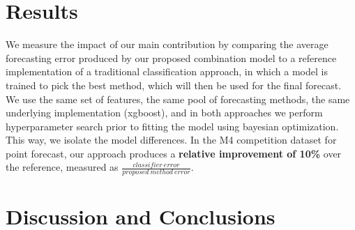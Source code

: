 \documentclass[11pt,a4paper,]{article}
\theoremstyle{definition}
\theoremstyle{definition}
\theoremstyle{definition}
\theoremstyle{remark}
\begin{document}
\section{Results}\label{results}

We measure the impact of our main contribution by comparing the average
forecasting error produced by our proposed combination model to a
reference implementation of a traditional classification approach, in
which a model is trained to pick the best method, which will then be
used for the final forecast. We use the same set of features, the same
pool of forecasting methods, the same underlying implementation
(xgboost), and in both approaches we perform hyperparameter search prior
to fitting the model using bayesian optimization. This way, we isolate
the model differences. In the M4 competition dataset for point forecast,
our approach produces a \textbf{relative improvement of 10\%} over the
reference, measured as
\(\frac{classifier\ error}{proposed\ method\ error}\).

\section{Discussion and Conclusions}\label{conclusion}

\printbibliography[title=References]
\end{document}
